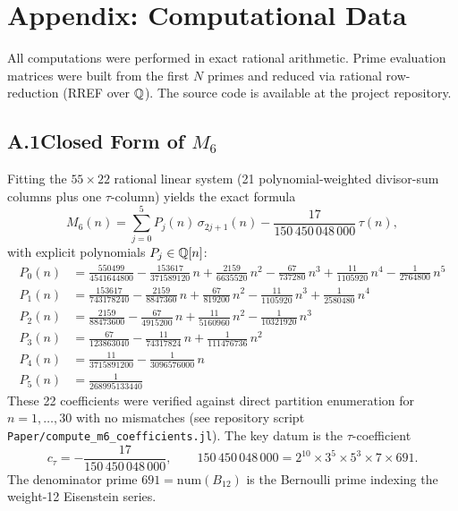 
\section*{Appendix: Computational Data}
\label{app:computations}

All computations were performed in exact rational arithmetic.
Prime evaluation matrices were built from the first $N$ primes and reduced via
rational row-reduction (RREF over $\mathbb{Q}$).
The source code is available at the project repository.

\subsection*{A.1\quad Closed Form of $M_6$}
\label{app:M6-formula}

Fitting the $55\times 22$ rational linear system
(21 polynomial-weighted divisor-sum columns plus one $\tau$-column)
yields the exact formula
\[
  M_6(n) = \sum_{j=0}^{5} P_j(n)\,\sigma_{2j+1}(n)
            - \frac{17}{150\,450\,048\,000}\,\tau(n),
\]
with explicit polynomials $P_j\in\mathbb{Q}[n]$:
\begin{align*}
P_0(n)&=\frac{550499}{4541644800}-\frac{153617}{371589120}\,n+\frac{2159}{6635520}\,n^2-\frac{67}{737280}\,n^3+\frac{11}{1105920}\,n^4-\frac{1}{2764800}\,n^5\\[4pt]
P_1(n)&=\frac{153617}{743178240}-\frac{2159}{8847360}\,n+\frac{67}{819200}\,n^2-\frac{11}{1105920}\,n^3+\frac{1}{2580480}\,n^4\\[4pt]
P_2(n)&=\frac{2159}{88473600}-\frac{67}{4915200}\,n+\frac{11}{5160960}\,n^2-\frac{1}{10321920}\,n^3\\[4pt]
P_3(n)&=\frac{67}{123863040}-\frac{11}{74317824}\,n+\frac{1}{111476736}\,n^2\\[4pt]
P_4(n)&=\frac{11}{3715891200}-\frac{1}{3096576000}\,n\\[4pt]
P_5(n)&=\frac{1}{268995133440}
\end{align*}
These 22 coefficients were verified against direct partition enumeration for
$n=1,\ldots,30$ with no mismatches (see repository script
\texttt{Paper/compute\_m6\_coefficients.jl}).
The key datum is the $\tau$-coefficient
\[
  c_\tau = -\frac{17}{150\,450\,048\,000},
  \qquad
  150\,450\,048\,000 = 2^{10}\times 3^5\times 5^3\times 7\times 691.
\]
The denominator prime $691 = \mathrm{num}(B_{12})$ is the Bernoulli prime
indexing the weight-12 Eisenstein series.

